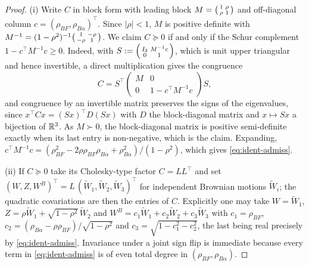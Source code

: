 \documentclass[../../../main.tex]{subfiles}
\begin{document}
\begin{proof}
(i) Write $C$ in block form with leading block $M=\begin{psmallmatrix}1&\rho\\ \rho&1\end{psmallmatrix}$ and off-diagonal column $c=(\rho_{BF},\rho_{B\alpha})^{\!\top}$. Since $|\rho|<1$, $M$ is positive definite with $M^{-1}=(1-\rho^2)^{-1}\begin{psmallmatrix}1&-\rho\\ -\rho&1\end{psmallmatrix}$. We claim $C\succeq0$ if and only if the Schur complement $1-c^{\!\top}M^{-1}c\ge0$. Indeed, with $S:=\begin{psmallmatrix}I_2&M^{-1}c\\ 0&1\end{psmallmatrix}$, which is unit upper triangular and hence invertible, a direct multiplication gives the congruence
\[
C=S^{\!\top}\begin{pmatrix}M&0\\ 0&1-c^{\!\top}M^{-1}c\end{pmatrix}S ,
\]
and congruence by an invertible matrix preserves the signs of the eigenvalues, since $x^{\!\top}Cx=(Sx)^{\!\top}D(Sx)$ with $D$ the block-diagonal matrix and $x\mapsto Sx$ a bijection of $\mathbb{R}^3$. As $M\succ0$, the block-diagonal matrix is positive semi-definite exactly when its last entry is non-negative, which is the claim. Expanding, $c^{\!\top}M^{-1}c=(\rho_{BF}^2-2\rho\rho_{BF}\rho_{B\alpha}+\rho_{B\alpha}^2)/(1-\rho^2)$, which gives \eqref{eq:ident-admiss}.

(ii) If $C\succeq0$ take its Cholesky-type factor $C=LL^{\!\top}$ and set $(W,Z,W^B)^{\!\top}=L\,(\tilde W_1,\tilde W_2,\tilde W_3)^{\!\top}$ for independent Brownian motions $\tilde W_i$; the quadratic covariations are then the entries of $C$. Explicitly one may take $W=\tilde W_1$, $Z=\rho\tilde W_1+\sqrt{1-\rho^2}\,\tilde W_2$ and $W^B=c_1\tilde W_1+c_2\tilde W_2+c_3\tilde W_3$ with $c_1=\rho_{BF}$, $c_2=(\rho_{B\alpha}-\rho\rho_{BF})/\sqrt{1-\rho^2}$ and $c_3=\sqrt{1-c_1^2-c_2^2}$, the last being real precisely by \eqref{eq:ident-admiss}. Invariance under a joint sign flip is immediate because every term in \eqref{eq:ident-admiss} is of even total degree in $(\rho_{BF},\rho_{B\alpha})$.


\end{proof}
\end{document}
